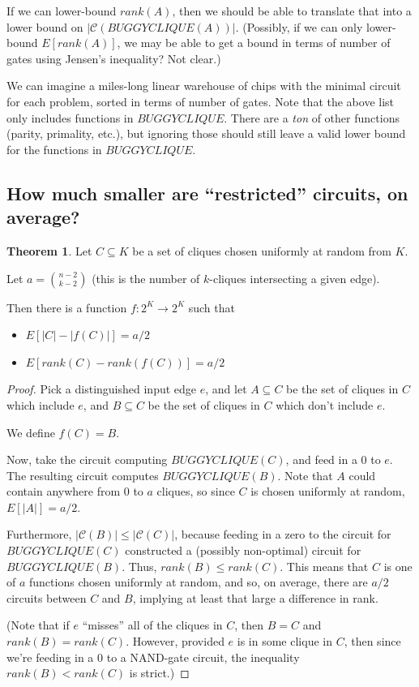 \documentclass[12pt]{article}
\theoremstyle{definition}
\newtheorem{thm}{Theorem}[section]
\newcommand{\bigC}[0]{\mathcal{C}}
\begin{document}
If we can lower-bound $rank(A)$, then we should be able to translate
that into a
lower bound on $|\bigC(BUGGYCLIQUE(A))|$. (Possibly, if we
can only lower-bound $E[rank(A)]$, we may be able to get
a bound in terms of number of gates using Jensen's inequality?
Not clear.)

We can imagine a miles-long linear warehouse of chips with the minimal
circuit for each problem, sorted in terms of number of gates.
Note that the above list only includes functions in $BUGGYCLIQUE$.
There are a {\em ton} of other functions (parity, primality, etc.), but ignoring
those should still leave a valid lower bound for the functions in $BUGGYCLIQUE$.

\subsection{How much smaller are ``restricted'' circuits, on average?}

\begin{thm}
\label{vaguelyUpward}
Let $C \subseteq K$ be a set of cliques chosen uniformly at random
from $K$.

Let $a = {n-2 \choose k-2}$ (this is the number of $k$-cliques
intersecting a given edge).

Then there is a function $f: 2^K \rightarrow 2^K$ such that
\begin{itemize}

\item $E[|C| - |f(C)|] = a/2$

\item $E[rank(C) - rank(f(C))] = a/2$

\end{itemize}

\end{thm}
\begin{proof}

Pick a distinguished input edge $e$, and let $A \subseteq C$ be
the set of cliques in $C$ which include $e$, and $B \subseteq C$ be
the set of cliques in $C$ which don't include $e$.

We define $f(C) = B$.

Now, take the circuit computing $BUGGYCLIQUE(C)$, and
feed in a 0 to $e$. The resulting circuit computes
$BUGGYCLIQUE(B)$. Note that $A$ could contain anywhere
from 0 to $a$
cliques, so since $C$ is chosen uniformly at random,
$E[|A|] = a/2$.

Furthermore, $|\bigC(B)| \le |\bigC(C)|$, because feeding in
a zero to the circuit for $BUGGYCLIQUE(C)$ constructed a
(possibly non-optimal) circuit for $BUGGYCLIQUE(B)$.
Thus, $rank(B) \le rank(C)$.
This means that
$C$ is one of $a$ functions chosen uniformly at random,
and so, on average, there are $a/2$ circuits between $C$
and $B$, implying at least that large a difference in rank.

(Note that if $e$ ``misses'' all of the cliques in $C$, then $B = C$
and $rank(B) = rank(C)$. However, provided $e$ is in some clique in $C$,
then since we're feeding in a 0 to a NAND-gate circuit,
the inequality $rank(B) < rank(C)$ is strict.)

\end{proof}
\end{document}
